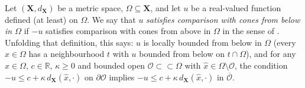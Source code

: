 \begin{definition}
Let $(\mathbf X, d_{\mathbf X})$ be a metric space, $\Omega\subseteq\mathbf X$, and let $u$ be a real-valued function defined (at least) on $\Omega$. We say that $u$ \emph{satisfies comparison with cones from below in $\Omega$} if $-u$ satisfies comparison with cones from above in $\Omega$ in the sense of . Unfolding that definition, this says: $u$ is locally bounded from below in $\Omega$ (every $x\in\Omega$ has a neighbourhood $t$ with $u$ bounded from below on $t\cap\Omega$), and for any $\hat x\in\Omega$, $c\in\mathbb R$, $\kappa\ge0$ and bounded open $\mathcal O\subset\subset\Omega$ with $\hat x\in\Omega\setminus\mathcal O$, the condition $-u\le c+\kappa\,d_{\mathbf X}(\hat x,\cdot)$ on $\partial\mathcal O$ implies $-u\le c+\kappa\,d_{\mathbf X}(\hat x,\cdot)$ in $\overline{\mathcal O}$.
\end{definition}
